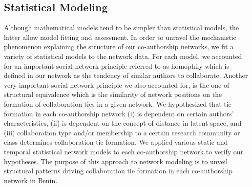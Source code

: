 \subsection{Statistical Modeling}
Although mathematical models tend to be simpler than statistical models, the latter allow model fitting and assessment. In order to unravel the mechanistic phenomenon explaining the structure of our 	co-authorship networks, we fit a variety of statistical models to the network data. For each model, we accounted for an important social network principle referred to as homophily which is defined in our network as the tendency of similar authors to collaborate. Another very important social network principle we also accounted for, is the one of structural equivalence which is the similarity of network positions on the formation of collaboration ties in a given network. We hypothesized that tie formation in each co-authorship network (i) is dependent on certain authors' characteristics,  (ii) is dependent on the concept of distance in latent space, and (iii) collaboration type and/or membership to a certain research community or class determines collaboration tie formation. We applied various static and temporal statistical network models to each co-authorship network to verify our hypotheses. The purpose of this approach to network modeling is to unveil structural patterns driving collaboration tie formation in each co-authorship network in Benin.

